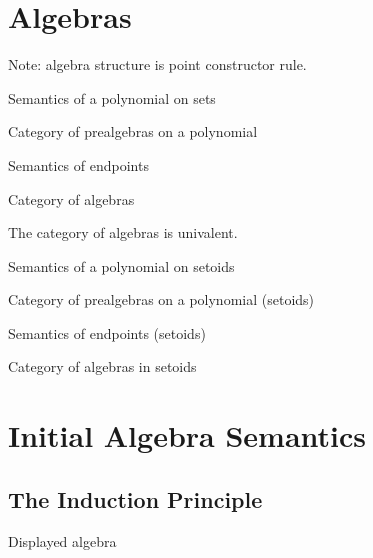 \documentclass[9pt]{entcs} \usepackage{entcsmacro}
\begin{document}
\section{Algebras}
Note: algebra structure is point constructor rule.

\begin{definition}
Semantics of a polynomial on sets
\end{definition}

\begin{definition}
Category of prealgebras on a polynomial
\end{definition}

\begin{definition}
Semantics of endpoints
\end{definition}

\begin{definition}
Category of algebras
\end{definition}

\begin{proposition}
The category of algebras is univalent.
\end{proposition}

\begin{definition}
Semantics of a polynomial on setoids
\end{definition}

\begin{definition}
Category of prealgebras on a polynomial (setoids)
\end{definition}

\begin{definition}
Semantics of endpoints (setoids)
\end{definition}

\begin{definition}
Category of algebras in setoids
\end{definition}

\section{Initial Algebra Semantics}

\subsection{The Induction Principle}

\begin{definition}
Displayed algebra
\end{definition}
\end{document}
